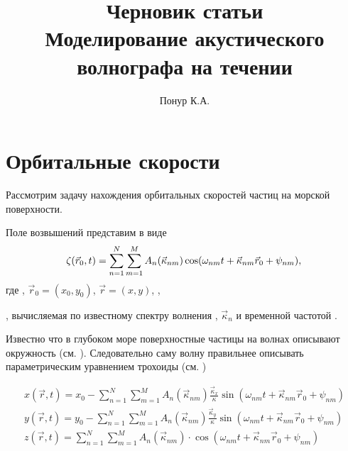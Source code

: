 



\newcommand\fullsum{\sum\limits_{n=1}^{N} \sum\limits_{m=1}^{M}}
\newcommand\fullphase{\omega_{nm}t + \vec \kappa_{nm}\vec r_0 + \psi_{nm}}

\title{Черновик статьи \\ \textbf{Моделирование акустического волнографа на
течении}}
\author{Понур К.А.}


\maketitle

\section*{Орбитальные скорости}%
\label{sec:orbital_nye_skorosti}

Рассмотрим задачу нахождения орбитальных скоростей частиц на морской
поверхности.

Поле возвышений  представим в виде
\begin{equation}
    \label{eq:surface3d_default}
    \zeta(\vec r_0,t) = \fullsum A_n(\vec \kappa_{nm}) \cos(\fullphase),    \\
\end{equation}
где ,  
$\vec r_0 = (x_0, y_0)$, $\vec r = (x, y)$, 
, 

, вычисляемая по известному спектру волнения \cite{ryabkova},
$\vec \kappa_n$ и временной частотой
 \cite{pustovoytenko}.



Известно что в глубоком море
поверхностные частицы на волнах описывают окружность (см. \cite{shuleykin}).
Следовательно саму волну правильнее описывать параметрическим уравнением
трохоиды (см. \cite{nouguier})

\begin{equation}
    \begin{gathered}
        \label{eq:surface3d_cwm}
        x(\vec r,t) = x_0 - \fullsum A_n(\vec \kappa_{nm})\frac{\vec \kappa_x}{\kappa}        \sin(\fullphase)\\
        y(\vec r,t) = y_0 - \fullsum A_n(\vec \kappa_{nm}) \frac{\vec \kappa_y}{\kappa}
        \sin(\fullphase)\\
        z(\vec r,t) = \fullsum
        A_n(\vec \kappa_{nm}) \cdot \cos(\fullphase)    \\
    \end{gathered}
\end{equation}

